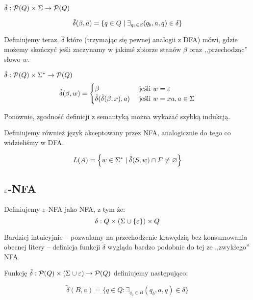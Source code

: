 \begin{definition}
    \( \tilde \delta : \powerset\pars{Q} \times \Sigma \rightarrow \powerset\pars{Q} \)
    
    \[
        \tilde \delta(\beta, a) 
            = \set{q \in Q \mid \exists_{q_b \in \beta} (q_b, a, q) \in \delta}
    \]
\end{definition}

Definiujemy teraz, \( \hat \delta \) które (trzymając się pewnej analogii z DFA) mówi, gdzie możemy skończyć jeśli zaczynamy w jakimś zbiorze stanów \( \beta \) oraz ,,przechodząc'' słowo \( w \).
\begin{definition}
    \( \hat \delta : \powerset\pars{Q} \times \Sigma^* \rightarrow \powerset\pars{Q} \)
    \[
        \hat \delta(\beta, w) = \begin{cases}
        \beta & \text{ jeśli } w = \varepsilon \\
        \tilde \delta(\hat \delta(\beta, x), a) & \text{ jeśli } w = xa, a \in \Sigma \\
        \end{cases}
    \]
\end{definition}

Ponownie, zgodność definicji z semantyką można wykazać szybką indukcją. 

Definiujemy również język akceptowany przez NFA, analogicznie do tego co widzieliśmy w DFA.

\begin{definition}
    \[ 
        L(A) = \set{w \in \Sigma^* \mid \hat \delta(S, w) \cap F \neq \varnothing}
    \]
\end{definition}


\subsection{\texorpdfstring{\(\varepsilon\)}{epsilon}-NFA}

\begin{definition}
    Definiujemy \( \varepsilon \)-NFA jako NFA, z tym że:
    \[
        \delta: Q \times (\Sigma \cup \set{\eps}) \times Q
    \]
\end{definition}
Bardziej intuicyjnie -- pozwalamy na przechodzenie krawędzią bez konsumowania obecnej litery -- definicja funkcji \( \tilde \delta \) wygląda bardzo podobnie do tej ze ,,zwykłego'' NFA. 

\begin{definition}
    Funkcję \(\tilde \delta : \operatorname{\mathcal{P}}(Q) \times (\Sigma \cup \varepsilon)  \rightarrow \operatorname{\mathcal{P}}(Q) \) definiujemy następująco: 
    
    \begin{equation*}
        \tilde \delta (B, a) = \{ q \in Q : \exists_{q_b \in B}  (q_b, a, q) \in \delta \}
    \end{equation*}
\end{definition}

